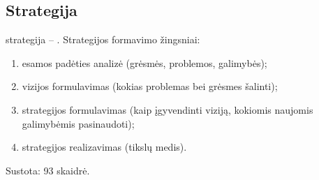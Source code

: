 \subsection{Strategija}

\Gls{strategija} – . Strategijos formavimo
žingsniai:
\begin{enumerate}
  \item esamos padėties analizė (grėsmės, problemos, galimybės);
  \item vizijos formulavimas (kokias problemas bei grėsmes šalinti);
  \item strategijos formulavimas (kaip įgyvendinti viziją, kokiomis
    naujomis galimybėmis pasinaudoti);
  \item strategijos realizavimas (tikslų medis).
\end{enumerate}

Sustota: 93 skaidrė.

